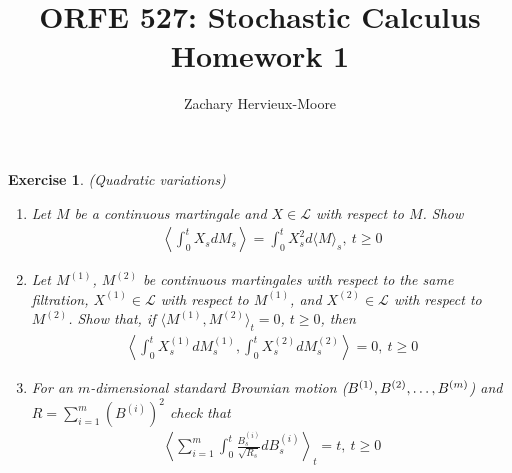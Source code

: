 \documentclass[12pt]{article}
\title{ORFE 527: Stochastic Calculus \\ Homework 1}
\author{Zachary Hervieux-Moore}
\date{\displaydate{date}}
\theoremstyle{colon}
\newtheorem{exercise}{Exercise}
\begin{document}
\maketitle

\clearpage

\begin{exercise}
  (Quadratic variations)
  \begin{enumerate}[label=\alph*)]
    \item Let $M$ be a continuous martingale and $X \in \mathcal{L}$ with respect to $M$. Show
      \begin{gather*}
        \left \langle \int_0^t X_s d M_s \right \rangle = \int_0^t X_s^2 d \langle M \rangle_s, \ t \geq 0
      \end{gather*}

    \item Let $M^{(1)}$, $M^{(2)}$ be continuous martingales with respect to the same filtration, $X^{(1)} \in \mathcal{L}$ with respect to $M^{(1)}$, and $X^{(2)} \in \mathcal{L}$ with respect to $M^{(2)}$. Show that, if $\langle M^{(1)}, M^{(2)} \rangle_t = 0$, $t \geq 0$, then
      \begin{gather*}
        \left \langle \int_0^t X_s^{(1)} d M_s^{(1)}, \int_0^t X_s^{(2)} d M_s^{(2)} \right \rangle = 0, \ t \geq 0
      \end{gather*}

    \item For an $m$-dimensional standard Brownian motion ($B^{(1)}, B^{(2)}, \mathellipsis, B^{(m)}$) and $R = \sum_{i=1}^m (B^{(i)})^2$ check that
      \begin{gather*}
        \left \langle \sum_{i=1}^m \int_0^t \frac{B_s^{(i)}}{\sqrt{R_s}} d B_s^{(i)} \right \rangle_t = t, \ t \geq 0
      \end{gather*}
  \end{enumerate}
\end{exercise}
\end{document}
